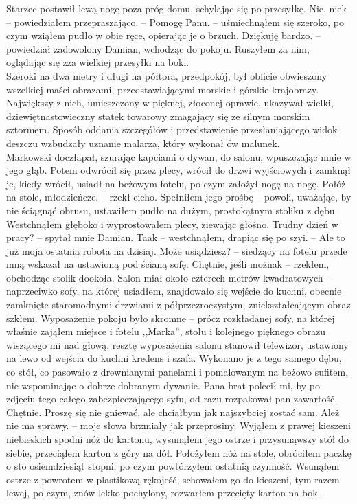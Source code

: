 \documentclass[../MAIN.tex]{subfiles}
\begin{document}
Starzec postawił lewą nogę poza próg domu, schylając się po przesyłkę.
\sx Nie, nie\3k -- powiedziałem przepraszająco. -- Pomogę Panu. -- uśmiechnąłem się szeroko, po czym wziąłem pudło w obie ręce, opierając je o brzuch.
\xx Dziękuję bardzo. -- powiedział zadowolony Damian, wchodząc do pokoju. 
\qd
Ruszyłem za nim, oglądając się zza wielkiej przesyłki na boki.
\\
Szeroki na dwa metry i długi na półtora, przedpokój, był obficie obwieszony wszelkiej maści obrazami, przedstawiającymi morskie i górskie krajobrazy. Największy z nich, umieszczony w pięknej, złoconej oprawie, ukazywał wielki, dziewiętnastowieczny statek towarowy zmagający się ze silnym morskim sztormem. Sposób oddania szczegółów i przedstawienie przesłaniającego widok deszczu wzbudzały uznanie malarza, który wykonał ów malunek.
\\
Markowski doczłapał, szurając kapciami o dywan, do salonu, wpuszczając mnie w jego głąb. Potem odwrócił się przez plecy, wrócił do drzwi wyjściowych i zamknął je, kiedy wrócił, usiadł na beżowym fotelu, po czym założył nogę na nogę.
\sx Połóż na stole, młodzieńcze. -- rzekł cicho.
\qd
Spełniłem jego prośbę -- powoli, uważając, by nie ściągnąć obrusu, ustawiłem pudło na dużym, prostokątnym stoliku z dębu. Westchnąłem głęboko i wyprostowałem plecy, ziewając głośno.
\sx Trudny dzień w pracy? -- spytał mnie Damian.
\xx Taa\3k -- westchnąłem, drapiąc się po szyi. -- Ale to już moja ostatnia robota na dzisiaj.
\xx Może usiądziesz? -- siedzący na fotelu przede mną wskazał na ustawioną pod ścianą sofę.
\xx Chętnie, jeśli można\3k -- rzekłem, obchodząc stolik dookoła.
\qd
Salon miał około czterech metrów kwadratowych -- naprzeciwko sofy, na której usiadłem, znajdowało się wejście do kuchni, obecnie zamknięte staromodnymi drzwiami z półprzezroczystym, zniekształcającym obraz szkłem. Wyposażenie pokoju było skromne -- prócz rozkładanej sofy, na której właśnie zająłem miejsce i fotelu ,,Marka'', stołu i kolejnego pięknego obrazu wiszącego mi nad głową, resztę wyposażenia salonu stanowił telewizor, ustawiony na lewo od wejścia do kuchni kredens i szafa. Wykonano je z tego samego dębu, co stół, co pasowało z drewnianymi panelami i pomalowanym na beżowo sufitem, nie wspominając o dobrze dobranym dywanie.
\sx Pana brat polecił mi, by po zdjęciu tego całego zabezpieczającego syfu, od razu rozpakował pan zawartość.
\xx Chętnie. Proszę się nie gniewać, ale chciałbym jak najszybciej zostać sam.
\xx Ależ nie ma sprawy. -- moje słowa brzmiały jak przeprosiny. 
\qd
Wyjąłem z prawej kieszeni niebieskich spodni nóż do kartonu, wysunąłem jego ostrze i przysunąwszy stół do siebie, przeciąłem karton z góry na dół. Położyłem nóż na stole, obróciłem paczkę o sto osiemdziesiąt stopni, po czym powtórzyłem ostatnią czynność. Wsunąłem ostrze z powrotem w plastikową rękojeść, schowałem go do kieszeni, tym razem lewej, po czym, znów lekko pochylony, rozwarłem przecięty karton na bok.
\end{document}
